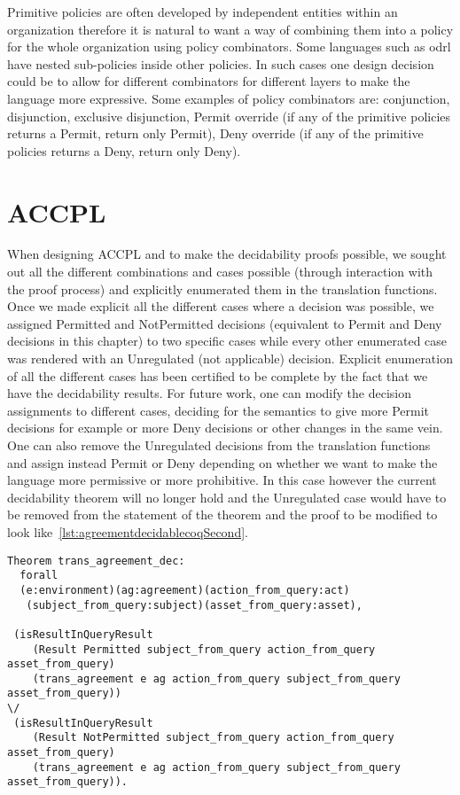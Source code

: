 Primitive policies are often developed by independent entities within an organization therefore it is natural to want a way of combining them into a policy for the whole organization using policy combinators. Some languages such as \ac{odrl} have nested sub-policies inside other policies. In such cases one design decision could be to allow for different combinators for different layers to make the language more expressive. Some examples of policy combinators are: conjunction, disjunction, exclusive disjunction, Permit override (if any of the primitive policies returns a Permit, return only Permit), Deny override (if any of the primitive policies returns a Deny, return only Deny).

\section{ACCPL}

When designing \ac{ACCPL} and to make the decidability proofs possible, we sought out all the different combinations and cases possible (through interaction with the proof process) and explicitly enumerated them in the translation functions. Once we made explicit all the different cases where a decision was possible, we assigned Permitted and NotPermitted decisions (equivalent to Permit and Deny decisions in this chapter) to two specific cases while every other enumerated case was rendered with an Unregulated (not applicable) decision. Explicit enumeration of all the different cases has been certified to be complete by the fact that we have the decidability results. For future work, one can modify the decision assignments to different cases, deciding for the semantics to give more Permit decisions for example or more Deny decisions or other changes in the same vein. One can also remove the Unregulated decisions from the translation functions and assign instead Permit or Deny depending on whether we want to make the language more permissive or more prohibitive. In this case however the current decidability theorem will no longer hold and the Unregulated case would have to be removed from the statement of the theorem and the proof to be modified to look like~\ref{lst:agreementdecidablecoqSecond}.

\begin{lstlisting}
Theorem trans_agreement_dec:
  forall
  (e:environment)(ag:agreement)(action_from_query:act)
   (subject_from_query:subject)(asset_from_query:asset),

 (isResultInQueryResult 
    (Result Permitted subject_from_query action_from_query asset_from_query)
    (trans_agreement e ag action_from_query subject_from_query asset_from_query)) 
\/
 (isResultInQueryResult 
    (Result NotPermitted subject_from_query action_from_query asset_from_query)
    (trans_agreement e ag action_from_query subject_from_query asset_from_query)).

\end{lstlisting}


